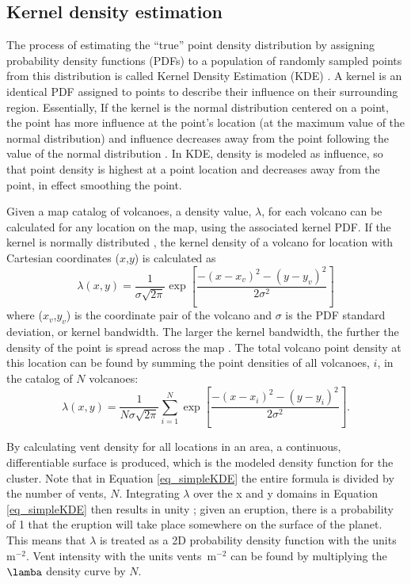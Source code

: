 \subsection{Kernel density estimation}\label{sec_kde}
The process of estimating the ``true'' point density distribution by assigning probability density functions (PDFs) to a population of randomly sampled points from this distribution is called Kernel Density Estimation (KDE) \citep{silverman1986density}. A kernel is an identical PDF assigned to points to describe their influence on their surrounding region. Essentially, If the kernel is the normal distribution centered on a point, the point has more influence at the point's location (at the maximum value of the normal distribution) and influence decreases away from the point following the value of the normal distribution \citep{lutz1995improved}. In KDE, density is modeled as influence, so that point density is highest at a point location and decreases away from the point, in effect smoothing the point.

Given a map catalog of volcanoes, a density value, $\lambda$, for each volcano can be calculated for any location on the map, using the associated kernel PDF. If the kernel is normally distributed \citep{conway1998recurrence}, the kernel density of a volcano for location with Cartesian coordinates ($x$,$y$) is calculated as
\begin{equation}
\lambda(x,y) = \frac{1}{\sigma\sqrt{2\pi}}\exp\left[\frac{-(x-x_v)^2-(y-y_v)^2}{2\sigma^2}\right]
\end{equation}
where ($x_v$,$y_v$) is the coordinate pair of the volcano and $\sigma$ is the PDF standard deviation, or kernel bandwidth. The larger the kernel bandwidth, the further the density of the point is spread across the map \citep{lutz1995improved}. The total volcano point density at this location can be found by summing the point densities of all volcanoes, $i$, in the catalog of $N$ volcanoes:
\begin{equation}
\lambda(x,y) = \frac{1}{N\sigma\sqrt{2\pi}}\sum\limits_{i=1}^{N}\exp\left[\frac{-(x-x_i)^2-(y-y_i)^2}{2\sigma^2}\right].
\label{eq_simpleKDE}
\end{equation}

By calculating vent density for all locations in an area, a continuous, differentiable surface is produced, which is the modeled density function for the cluster. Note that in Equation \ref{eq_simpleKDE} the entire formula is divided by the number of vents, $N$. Integrating $\lambda$ over the x and y domains in Equation \ref{eq_simpleKDE} then results in unity \citep{connor2015probabilistic}; given an eruption, there is a probability of 1 that the eruption will take place somewhere on the surface of the planet. This means that $\lambda$ is treated as a 2D probability density function with the units m$^{-2}$. Vent intensity with the units vents~m$^{-2}$ can be found by multiplying the $\lamba$ density curve by $N$.

